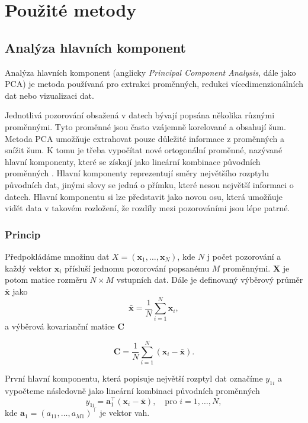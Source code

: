 \chapter{Použité metody}


\section{Analýza hlavních komponent}

Analýza hlavních komponent (anglicky \emph{Principal Component Analysis}, dále jako PCA) je metoda používaná pro extrakci proměnných, redukci vícedimenzionálních dat nebo vizualizaci dat.

Jednotlivá pozorování obsažená v datech bývají popsána několika různými proměnnými. Tyto proměnné jsou často vzájemně korelované a obsahují šum. Metoda PCA umožňuje extrahovat pouze důležité informace z proměnných a snížit šum. K tomu je třeba vypočítat nové ortogonální proměnné, nazývané hlavní komponenty, které se získají jako lineární kombinace původních proměnných \cite{bib:PCA1}. Hlavní komponenty reprezentují směry největšího rozptylu původních dat, jinými slovy se jedná o přímku,  které nesou největší informaci o datech. Hlavní komponentu si lze představit jako novou osu, která umožňuje vidět data v takovém rozložení, že rozdíly mezi pozorováními jsou lépe patrné.  %

\subsection{Princip}

Předpokládáme množinu dat $X = (\bm{x}_1, \ldots, \bm{x}_N )$, kde $N$ j počet pozorování a každý vektor $\bm{x}_i$ přísluší jednomu pozorování popsanému $M$ proměnnými. $\mathbf{X}$ je potom matice rozměru $N\times M$ vstupních dat. Dále je definovaný výběrový průměr $\bar{\bm{x}}$ jako
\begin{equation}
    \bar{\bm{x}} = \frac{1}{N} \sum_{i=1}^{N} \bm{x}_i,
\end{equation}
a výběrová kovarianční matice $\mathbf{C}$

\begin{equation}
    \mathbf{\mathbf{C}} = \frac{1}{N} \sum_{i=1}^{N} (\bm{x}_i - \bar{\bm{x}}).
\end{equation}

První hlavní komponentu, která popisuje největší rozptyl dat označíme $y_{1i}$ a vypočteme následovně jako lineární kombinaci původních proměnných
\begin{equation}
    y_{1i} = \bm{a}_1^\top (\bm{x}_i - \bar{\bm{x}}), \quad \mbox{pro } i=1,\ldots,N,
\end{equation}
kde $\bm{a}_1 = (a_{11}, \ldots, a_{M1})^\top $ je vektor vah. 

